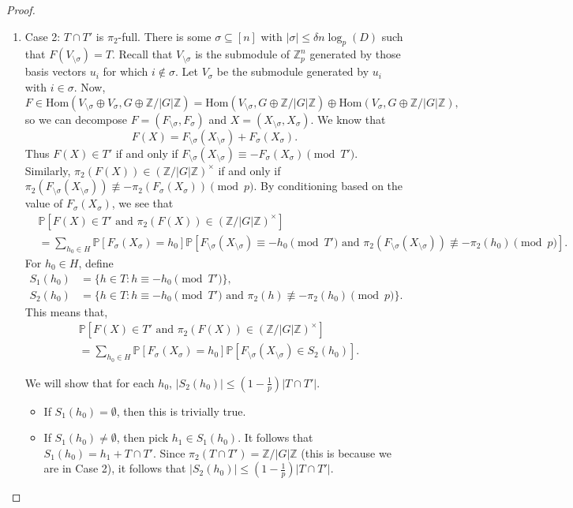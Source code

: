 \documentclass[12pt]{amsart}
\theoremstyle{definition}
\newcommand{\PPP}{\mathbb{P}}
\newcommand{\ZG}{\Z/\abs{G}\Z}
\newcommand{\abs}[1]{\vert#1\vert}
\newcommand{\Zp}{\Z_p}
\newcommand{\Z}{\mathbb{Z}}
\newcommand{\Hom}{\text{Hom}}
\begin{document}
\begin{proof}
\begin{enumerate}
    \item Case 2: $T\cap T'$ is $\pi_2$-full.
    There is some $\sigma\subseteq [n]$ with $\abs{\sigma}\leq \delta n \log_p(D)$ such that $F(V_{\setminus\sigma})=T$.
    Recall that $V_{\setminus\sigma}$ is the submodule of $\Zp^n$ generated by those basis vectors $u_i$ for which $i\notin \sigma$. Let $V_{\sigma}$ be the submodule generated by $u_i$ with $i\in \sigma$. Now,
    \[
    F\in\Hom(V_{\setminus\sigma}\oplus V_{\sigma},G\oplus\ZG)
    = \Hom(V_{\setminus\sigma},G\oplus\ZG) \oplus \Hom(V_{\sigma},G\oplus \ZG),
    \]
    so we can decompose $F=(F_{\setminus\sigma}, F_{\sigma})$ and $X=(X_{\setminus\sigma}, X_{\sigma})$. We know that
    \[ 
    F(X) 
    =F_{\setminus\sigma}(X_{\setminus\sigma})
    +F_{\sigma}(X_{\sigma}).
    \]
    Thus $F(X)\in T'$ if and only if $F_{\setminus\sigma}(X_{\setminus\sigma}) \equiv -F_{\sigma}(X_{\sigma}) \pmod{T'}$.
    Similarly, $ \pi_2(F(X))\in (\ZG)^{\times}$ if and only if $\pi_2(F_{\setminus\sigma}(X_{\setminus\sigma})) \not\equiv -\pi_2( F_{\sigma}(X_{\sigma})) \pmod{p}$.
    By conditioning based on the value of $F_{\sigma}(X_{\sigma})$, we see that
    \begin{align*}
    &\PPP[F(X)\in T' \text{ and } \pi_2(F(X))\in (\ZG)^{\times}]\\
    &=\sum_{h_0\in H}
    \PPP[F_{\sigma}(X_{\sigma}) =h_0]
    \PPP[F_{\setminus\sigma}(X_{\setminus\sigma}) \equiv -h_0\pmod{ T'} \text{ and } \pi_2(F_{\setminus\sigma}(X_{\setminus\sigma}))\not\equiv -\pi_2(h_0)\pmod{p}].
    \end{align*}
    For $h_0\in H$, define
    \begin{align*}
    S_1(h_0)&=\{h\in T : h\equiv -h_0\pmod{T'}\},\\
    S_2(h_0)&=\{h\in T : h\equiv -h_0\pmod{T'}\text{ and } \pi_2(h) \not \equiv -\pi_2(h_0)\pmod{p}\}.
    \end{align*}
    This means that,
    \begin{align*}
    &\PPP[F(X)\in T' \text{ and } \pi_2(F(X))\in (\ZG)^{\times}]\\
    &=\sum_{h_0\in H}
    \PPP[F_{\sigma}(X_{\sigma}) =h_0]
    \PPP[F_{\setminus\sigma}(X_{\setminus\sigma}) \in S_2(h_0)].
    \end{align*}
    
    We will show that for each $h_0$, $\abs{S_2(h_0)}\leq (1-\frac{1}{p}) \abs{T\cap T'}$.
    \begin{itemize}
        \item If $S_1(h_0)=\emptyset$, then this is trivially true.
        \item If $S_1(h_0)\neq\emptyset$, then pick $h_1\in S_1(h_0)$. It follows that $S_1(h_0)=h_1+T\cap T'$. Since $\pi_2(T\cap T')= \ZG$ (this is because we are in Case 2), it follows that $\abs{S_2(h_0)}\leq (1-\frac{1}{p}) \abs{T\cap T'}$.
    \end{itemize}


\end{enumerate}
\end{proof}
\end{document}
